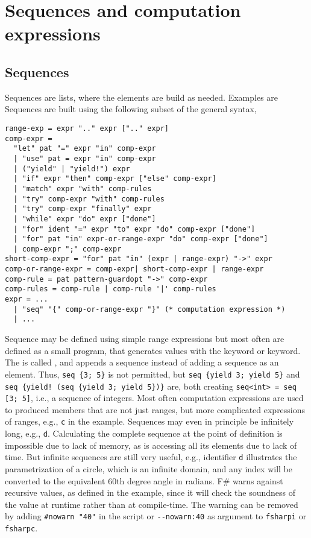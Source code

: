 \documentclass[fsharpnotes.tex]{subfiles}
\begin{document}
\chapter{Sequences and computation expressions}
\label{chap:sequences}
\section{Sequences}
\label{sec:sequences}
Sequences are lists, where the elements are build as needed. Examples are
%
%
Sequences are built using the following subset of the general syntax,
\begin{lstlisting}[language=ebnf]
range-exp = expr ".." expr [".." expr]
comp-expr =
  "let" pat "=" expr "in" comp-expr
  | "use" pat = expr "in" comp-expr
  | ("yield" | "yield!") expr
  | "if" expr "then" comp-expr ["else" comp-expr]
  | "match" expr "with" comp-rules
  | "try" comp-expr "with" comp-rules
  | "try" comp-expr "finally" expr
  | "while" expr "do" expr ["done"]
  | "for" ident "=" expr "to" expr "do" comp-expr ["done"]
  | "for" pat "in" expr-or-range-expr "do" comp-expr ["done"]
  | comp-expr ";" comp-expr
short-comp-expr = "for" pat "in" (expr | range-expr) "->" expr
comp-or-range-expr = comp-expr| short-comp-expr | range-expr
comp-rule = pat pattern-guardopt "->" comp-expr
comp-rules = comp-rule | comp-rule '|' comp-rules
expr = ... 
  | "seq" "{" comp-or-range-expr "}" (* computation expression *)
  | ...
\end{lstlisting}
%
Sequence may be defined using simple range expressions but most often are defined as a small program, that generates values with the  keyword or  keyword. The  is called , and appends a sequence instead of adding a sequence as an element. Thus, \lstinline!seq {3; 5}! is not permitted, but \lstinline!seq {yield 3; yield 5}! and \lstinline|seq {yield! (seq {yield 3; yield 5})}| are, both creating \lstinline!seq<int> = seq [3; 5]!, i.e., a sequence of integers. Most often computation expressions are used to produced members that are not just ranges, but more complicated expressions of ranges, e.g., \lstinline!c! in the example. Sequences may even in principle be infinitely long, e.g., \lstinline!d!. Calculating the complete sequence at the point of definition is impossible due to lack of memory, as is accessing all its elements due to lack of time. But infinite sequences are still very useful, e.g., identifier \lstinline!d! illustrates the parametrization of a circle, which is an infinite domain, and any index will be converted to the equivalent 60th degree angle in radians. F\# warns against recursive values, as defined in the example, since it will check the soundness of the value at runtime rather than at compile-time. The warning can be removed by adding \lstinline!#nowarn "40"! in the script or \lstinline!--nowarn:40! as argument to \lstinline[language=console]!fsharpi! or \lstinline[language=console]!fsharpc!.
\end{document}

